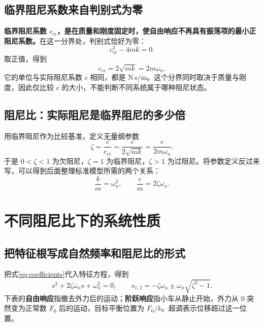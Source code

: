 \documentclass[UTF8,a4paper,11pt,fontset=windows]{ctexart}
\begin{document}
\subsection{临界阻尼系数来自判别式为零}
\textbf{临界阻尼系数 $c_{\mathrm{cr}}$，是在质量和刚度固定时，使自由响应不再具有振荡项的最小正阻尼系数。}在这一分界处，判别式恰好为零：
\[
  c_{\mathrm{cr}}^2-4mk=0.
\]
取正值，得到
\begin{equation}\label{eq:critical}
  \boxed{c_{\mathrm{cr}}=2\sqrt{mk}=2m\omega_n.}
\end{equation}
它的单位与实际阻尼系数 $c$ 相同，都是 $\mathrm{N\,s/m}$。这个分界同时取决于质量与刚度，因此仅比较 $c$ 的大小，不能判断不同系统属于哪种阻尼状态。

\subsection{阻尼比：实际阻尼是临界阻尼的多少倍}
用临界阻尼作为比较基准，定义无量纲参数
\begin{equation}\label{eq:zeta}
  \boxed{\zeta=\frac{c}{c_{\mathrm{cr}}}=\frac{c}{2\sqrt{mk}}=\frac{c}{2m\omega_n}.}
\end{equation}
于是 $0<\zeta<1$ 为欠阻尼，$\zeta=1$ 为临界阻尼，$\zeta>1$ 为过阻尼。将参数定义反过来写，可以得到后面整理标准模型所需的两个关系：
\begin{equation}\label{eq:coefficients}
  \boxed{\frac{k}{m}=\omega_n^2},
  \qquad
  \boxed{\frac{c}{m}=2\zeta\omega_n}.
\end{equation}

\newpage
\section{不同阻尼比下的系统性质}

\subsection{把特征根写成自然频率和阻尼比的形式}
把式\eqref{eq:coefficients}代入特征方程，得到
\[
  s^2+2\zeta\omega_n s+\omega_n^2=0,
  \qquad
  s_{1,2}=-\zeta\omega_n\pm\omega_n\sqrt{\zeta^2-1}.
\]
下表的\textbf{自由响应}指撤去外力后的运动；\textbf{阶跃响应}指小车从静止开始，外力从 $0$ 突然变为正常数 $F_0$ 后的运动，目标平衡位置为 $F_0/k$。超调表示位移超过这一位置。
\end{document}
